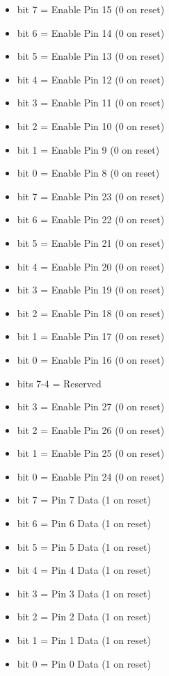 \begin{itemize}
\item bit 7 = Enable Pin 15 (0 on reset)
\item bit 6 = Enable Pin 14 (0 on reset)
\item bit 5 = Enable Pin 13 (0 on reset)
\item bit 4 = Enable Pin 12 (0 on reset)
\item bit 3 = Enable Pin 11 (0 on reset)
\item bit 2 = Enable Pin 10 (0 on reset)
\item bit 1 = Enable Pin 9 (0 on reset)
\item bit 0 = Enable Pin 8 (0 on reset)
\end{itemize}

\begin{itemize}
\item bit 7 = Enable Pin 23 (0 on reset)
\item bit 6 = Enable Pin 22 (0 on reset)
\item bit 5 = Enable Pin 21 (0 on reset)
\item bit 4 = Enable Pin 20 (0 on reset)
\item bit 3 = Enable Pin 19 (0 on reset)
\item bit 2 = Enable Pin 18 (0 on reset)
\item bit 1 = Enable Pin 17 (0 on reset)
\item bit 0 = Enable Pin 16 (0 on reset)
\end{itemize}

\begin{itemize}
\item bits 7-4 = Reserved
\item bit 3 = Enable Pin 27 (0 on reset)
\item bit 2 = Enable Pin 26 (0 on reset)
\item bit 1 = Enable Pin 25 (0 on reset)
\item bit 0 = Enable Pin 24 (0 on reset)
\end{itemize}

\begin{itemize}
\item bit 7 = Pin 7 Data (1 on reset)
\item bit 6 = Pin 6 Data (1 on reset)
\item bit 5 = Pin 5 Data (1 on reset)
\item bit 4 = Pin 4 Data (1 on reset)
\item bit 3 = Pin 3 Data (1 on reset)
\item bit 2 = Pin 2 Data (1 on reset)
\item bit 1 = Pin 1 Data (1 on reset)
\item bit 0 = Pin 0 Data (1 on reset)
\end{itemize}

